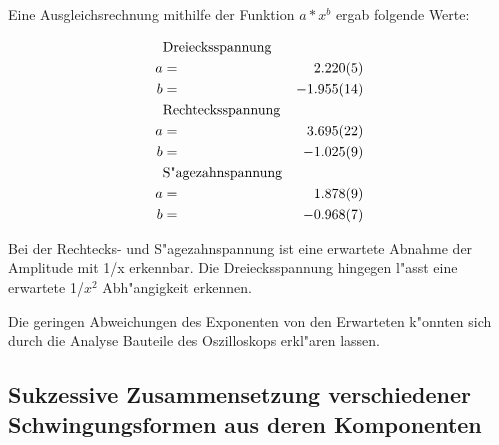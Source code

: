 Eine Ausgleichsrechnung mithilfe der Funktion $a*x^b$ ergab folgende Werte:

\begin{eqnarray*}
	&\text{Dreiecksspannung}& \\
	a &=& \SI{2.220 (5)}{} \\
	b &=& \SI{-1.955 (14)}{} \\
	&\text{Rechtecksspannung}& \\
	a &=& \SI{3.695  (22)}{} \\
	b &=& \SI{-1.025 (9)}{} \\
	&\text{S"agezahnspannung}& \\
	a &=& \SI{1.878 (9)}{} \\
	b &=& \SI{-0.968 (7)}{}
\end{eqnarray*}


Bei der Rechtecks- und S"agezahnspannung ist eine erwartete Abnahme der Amplitude mit 1/x erkennbar.
Die Dreiecksspannung hingegen l"asst eine erwartete 1/$x^2$ Abh"angigkeit erkennen.

Die geringen Abweichungen des Exponenten von den Erwarteten k"onnten sich durch die Analyse Bauteile des Oszilloskops erkl"aren lassen. 

\clearpage

\subsection{Sukzessive Zusammensetzung verschiedener Schwingungsformen aus deren Komponenten}
\label{sub:sukzessive_zusammensetzung_verschiedener_schwingungsformen_aus_deren_komponenten}

